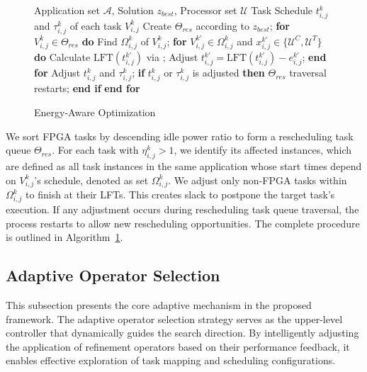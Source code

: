 \documentclass{IEEEtaes}
\makeatletter
\newcommand{\removelatexerror}{\let\@latex@error\@gobble}
\makeatother
\begin{document}
\begin{figure}[!t]
\renewcommand{\algorithmicrequire}{\textbf{Input:}}
\renewcommand{\algorithmicensure}{\textbf{Output:}}
\removelatexerror
\begin{algorithm}[H]
    \caption{Energy-Aware Optimization}
    \begin{algorithmic}[1]
        \REQUIRE Application set $\mathcal{A}$,  Solution $z_{best}$, Processor set $\mathcal{U}$ %
        \ENSURE Task Schedule $t_{i,j}^k$ and $\tau_{i,j}^k$ of each task $V_{i,j}^{k}$  %
        \STATE Create $\Theta_{res}$ according to $z_{best}$;
        \STATE \textbf{for} $V_{i,j}^k \in \Theta_{res}$ \textbf{do}
        \STATE \quad Find $\Omega_{i,j}^{k}$ of $V_{i,j}^k$;
        \STATE \quad \textbf{for} $V_{i,j}^{k'} \in \Omega_{i,j}^{k}$ and $x_{i,j}^{k'} \in \{\mathcal{U}^C,\mathcal{U}^T\}$ \textbf{do}
        \STATE \quad\quad Calculate $\text{LFT}(t_{i,j}^{k'})$ via ;
        \STATE \quad\quad Adjust $t_{i,j}^{k'}=\text{LFT}(t_{i,j}^{k'})-e_{i,j}^{k'}$;
        \STATE \quad \textbf{end for}
        \STATE \quad Adjust $t_{i,j}^{k}$ and $\tau_{i,j}^{k}$;
        \STATE \quad \textbf{if} $t_{i,j}^{k}$ or $\tau_{i,j}^{k}$ is adjusted \textbf{then}
        \STATE \quad\quad $\Theta_{res}$ traversal restarts;
        \STATE \quad \textbf{end if}
        \STATE \textbf{end for}
    \end{algorithmic}
    \label{alg:opt}
\end{algorithm}
\end{figure}

We sort FPGA tasks by descending idle power ratio to form a rescheduling task queue $\Theta_{res}$. For each task with $\eta_{i,j}^k>1$, we identify its affected instances, which are defined as all task instances in the same application whose start times depend on $V_{i,j}^{k}$'s schedule, denoted as set $\Omega_{i,j}^{k}$. We adjust only non-FPGA tasks within $\Omega_{i,j}^{k}$ to finish at their LFTs. This creates slack to postpone the target task's execution. If any adjustment occurs during rescheduling task queue traversal, the process restarts to allow new rescheduling opportunities.  The complete procedure is outlined in Algorithm~\ref{alg:opt}.

\subsection{Adaptive Operator Selection}
\label{subsec:quantum alg}
This subsection presents the core adaptive mechanism in the proposed framework. The adaptive operator selection strategy serves as the upper-level controller that dynamically guides the search direction. By intelligently adjusting the application of refinement operators based on their performance feedback, it enables effective exploration of task mapping and scheduling configurations.
\end{document}
